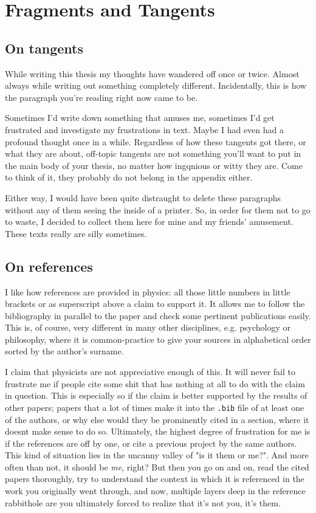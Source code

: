 \chapter{Fragments and Tangents}
\label{ch:fragments}

\section{On tangents}
While writing this thesis my thoughts have wandered off once or twice. Almost
always while writing out something completely different. Incidentally, this is
how the paragraph you're reading right now came to be.

Sometimes I'd write down something that amuses me, sometimes I'd get frustrated
and investigate my frustrations in text. Maybe I had even had a profound
thought once in a while.  Regardless of how these tangents got there, or what
they are about, off-topic tangents are not something you'll want to put in the
main body of your thesis, no matter how ingqnious or witty they are.  Come to
think of it, they probably do not belong in the appendix either.

Either way, I would have been quite distraught to delete these paragraphs
without any of them seeing the inside of a printer. So, in order for them not
to go to waste, I decided to collect them here for mine and my friends'
amusement. These texts really are silly sometimes.

\section{On references}
I like how references are provided in physics: all those little numbers in
little brackets or as superscript above a claim to support it. It allows me to
follow the bibliography in parallel to the paper and check some pertinent
publications easily. This is, of course, very different in many other
disciplines, e.g. psychology or philosophy, where it is common-practice to give
your sources in alphabetical order sorted by the author's surname.

I claim that physicists are not appreciative enough of this. It will never fail
to frustrate me if people cite some shit that has nothing at all to do with the
claim in question. This is especially so if the claim is better supported by
the results of other papers; papers that a lot of times make it into the
\texttt{.bib} file of at least one of the authors, or why else would they be
prominently cited in a section, where it doesnt make sense to do so.
Ultimately, the highest degree of frustration for me is if the references are
off by one, or cite a previous project by the same authors. This kind of
situation lies in the uncanny valley of "is it them or me?". And more often
than not, it should be \emph{me}, right? But then you go on and on, read the
cited papers thoroughly, try to understand the context in which it is
referenced in the work you originally went through, and now, multiple layers
deep in the reference rabbithole are you ultimately forced to realize that it's
not you, it's them. 

